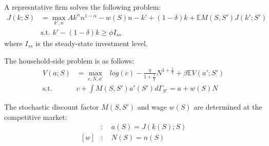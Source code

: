 A represntative firm solves the following problem:
\begin{align*}
  J(k;S) &= \max_{k',n} Ak^{\alpha}n^{1-\alpha} -w(S)n -k' + (1-\delta)k + \mathbb{E}M(S,S')J(k';S')
  \\
  &\text{s.t. } k' - (1-\delta)k \geq \phi I_{ss}
\end{align*}
where $I_{ss}$ is the steady-state investment level.

The household-side problem is as follows:
\begin{align*}
  V(a;S) &= \max_{c,N,a'}\text{ } log(c) - \frac{\eta}{1+\frac{1}{\chi}} N^{1+\frac{1}{\chi}} + \beta \mathbb{E}V(a';S')
  \\
  \text{s.t.}\quad& c + \int M(S,S') a'(S') d\Gamma_{S'} =  a + w(S)N
\end{align*}

The stochastic discount factor $M(S,S')$ and wage $w(S)$ are determined at the competitive market:
\begin{align*}
  [M]&:\quad a(S) = J(k(S);S)
  \\
  [w]&:\quad N(S) = n(S)
\end{align*}

